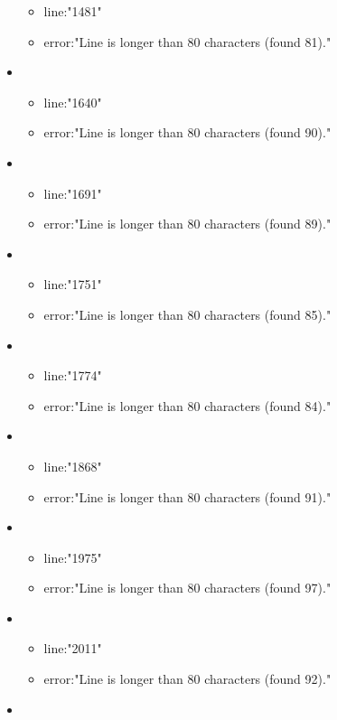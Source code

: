 \begin{itemize}
\begin{itemize}
		\item line:"1481" 
		\item error:"Line is longer than 80 characters (found 81)." 
	\end{itemize}
	\item 
	\begin{itemize} 
		\item line:"1640" 
		\item error:"Line is longer than 80 characters (found 90)." 
	\end{itemize}
	\item 
	\begin{itemize} 
		\item line:"1691" 
		\item error:"Line is longer than 80 characters (found 89)." 
	\end{itemize}
	\item 
	\begin{itemize} 
		\item line:"1751" 
		\item error:"Line is longer than 80 characters (found 85)." 
	\end{itemize}
	\item 
	\begin{itemize} 
		\item line:"1774" 
		\item error:"Line is longer than 80 characters (found 84)." 
	\end{itemize}
	\item 
	\begin{itemize} 
		\item line:"1868" 
		\item error:"Line is longer than 80 characters (found 91)." 
	\end{itemize}
	\item 
	\begin{itemize} 
		\item line:"1975" 
		\item error:"Line is longer than 80 characters (found 97)." 
	\end{itemize}
	\item 
	\begin{itemize} 
		\item line:"2011" 
		\item error:"Line is longer than 80 characters (found 92)." 
	\end{itemize}
	\item 
	\begin{itemize} 

\end{itemize}
\end{itemize}
